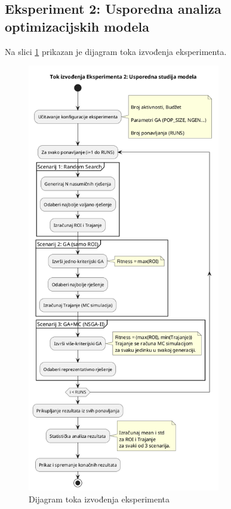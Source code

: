 \subsection{Eksperiment 2: Usporedna analiza optimizacijskih modela}

Na slici \ref{fig:tok_eksperimenta} prikazan je dijagram toka izvođenja eksperimenta. 
\begin{figure}[]
    \centering
    \includegraphics[width=0.75\textwidth]{slike/tok_eksperimenta2.png}
    \caption{Dijagram toka izvođenja eksperimenta}
    \label{fig:tok_eksperimenta}
\end{figure}

